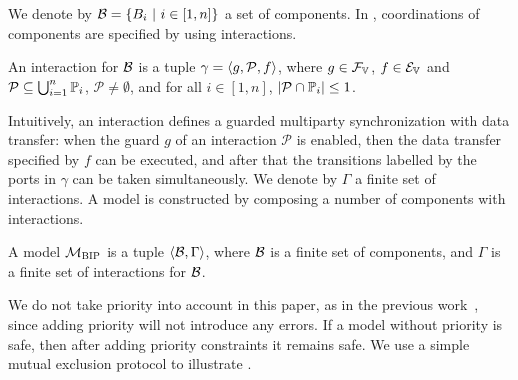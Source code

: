 %

We denote by $\mathcal{B} = \{B_{i} ~|~ i\in [1,n]\}$ a set of components.
%
In \BIP, coordinations of components are specified by using interactions.

\begin{definition} [Interaction]
\label{interaction}
An interaction for $\mathcal{B} $ is a tuple $\gamma = \langle{g, \mathcal{P}, f }\rangle $,
where $g \in \mathcal{F}_{\mathbb{V}_{}}$, $f\in \mathcal{E}_{\mathbb{V}_{}}$ and
$\mathcal{P} \subseteq \bigcup_{i=1}^n \mathbb{P}_{i}$, $\mathcal{P} \neq \emptyset$, and
for all $i \in [1, n]$, $|\mathcal{P} \cap \mathbb{P}_{i}| \le 1$.
\end{definition}

Intuitively, an interaction defines a guarded multiparty synchronization with data transfer:
when the guard $g$ of an interaction $\mathcal{P}$ is enabled,
then the data transfer specified by $f$ can be executed, and
after that the transitions labelled by the ports in $\gamma$ can be taken simultaneously.
%
We denote by $\Gamma$ a finite set of interactions.
A \BIP model is constructed by composing a number of components with interactions.

\begin{definition} 
A \BIP model $\mathcal{M}_{\textsc{BIP}}$ is a tuple $\langle{\ensuremath{\mathcal{B}},\Gamma}\rangle$,
 where $\mathcal{B}$ is a finite set of components,
 and $\Gamma$ is a finite set of interactions for $\mathcal{B}$.
\end{definition}

We do not take priority into account in this paper, as in the previous work~\cite{dfinder10,tgc15},
 since adding priority will not introduce any errors.
 If a model without priority is safe, then after adding priority constraints it remains safe.
 We use a simple mutual exclusion protocol to illustrate \BIP.

%

